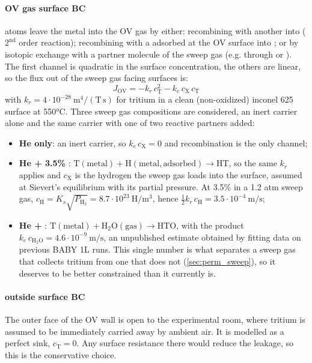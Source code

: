 \documentclass[a4paper,11pt,oneside]{report}
\begin{document}
\paragraph{OV gas surface BC}
 atoms leave the metal into the OV gas by either: recombining with another  into  ($\mathrm{2^{nd}}$ order reaction); recombining with a  adsorbed at the OV surface into ; or by isotopic exchange with a partner molecule of the sweep gas (e.g. through  or ). The first channel is quadratic in the surface concentration, the others are linear, so the flux out of the sweep gas facing surfaces is:
\begin{equation}
\label{eq:sweep_BC}
    J_\mathrm{OV}=-k_r\,c_\mathrm{T}^2-k_e\,c_\mathrm{X}\,c_\mathrm{T}
\end{equation}
with $k_r=4\cdot10^{-28} \ \mathrm{m^4/(T\,s)}$ for tritium in a clean (non-oxidized) inconel 625 surface at 550°C\cite{perujo_low_1996}. Three sweep gas compositions are considered, an inert carrier alone and the same carrier with one of two reactive partners added:
\begin{itemize}
    \item \textbf{He only}: an inert carrier, so $k_e\,c_\mathrm{X}=0$ and recombination is the only channel;
    \item \textbf{He + 3.5\% }: $\mathrm{T(metal)}+\mathrm{H(metal, adsorbed)}\rightarrow \mathrm{HT}$, so the same $k_r$ applies and $c_\mathrm{X}$ is the hydrogen the sweep gas loads into the surface, assumed at Sievert's equilibrium with its partial pressure. At 3.5\%  in a 1.2 atm sweep gas, $c_\mathrm{H}=K_s\sqrt{P_\mathrm{H_2}}=8.7\cdot10^{23} \ \mathrm{H/m^3}$, hence $\frac{1}{2}k_r\,c_\mathrm{H}=3.5\cdot10^{-4}\ \mathrm{m/s}$;
    \item \textbf{He + }: $\mathrm{T(metal)}+\mathrm{H_2O(gas)}\rightarrow \mathrm{HTO}$, with the product $k_e\,c_\mathrm{H_2O}=4.6\cdot10^{-9}\ \mathrm{m/s}$, an unpublished estimate obtained by fitting data on previous BABY 1L runs. This single number is what separates a sweep gas that collects tritium from one that does not (\cref{sec:perm_sweep}), so it deserves to be better constrained than it currently is.
\end{itemize}


\paragraph{outside surface BC}
The outer face of the OV wall is open to the experimental room, where tritium is assumed to be immediately carried away by ambient air. It is modelled as a perfect sink, $c_\mathrm{T}=0$. Any surface resistance there would reduce the leakage, so this is the conservative choice.
\end{document}

